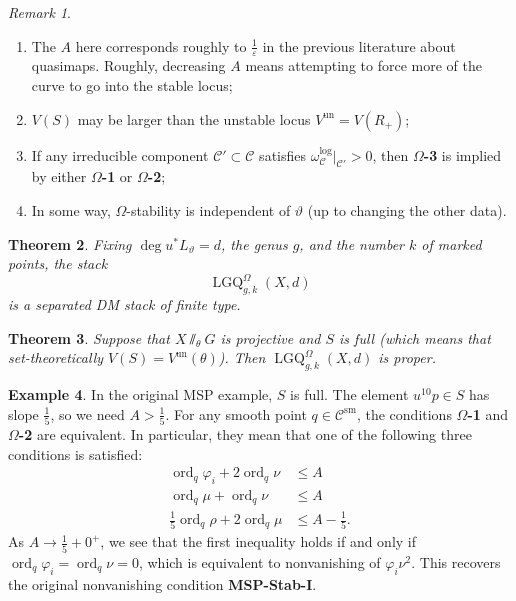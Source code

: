 \documentclass[10pt]{amsart}
\newtheorem{thm}{Theorem}[section]
\theoremstyle{definition}
\newtheorem{exm}[thm]{Example}
\theoremstyle{remark}
\newtheorem{rmk}[thm]{Remark}
\theoremstyle{plain}
\theoremstyle{definition}
\theoremstyle{remark}
\newcommand{\ep}{\varepsilon}
\newcommand{\mc}[1]{\mathcal{#1}}
\newcommand{\mr}[1]{\mathrm{#1}}
\newcommand{\on}[1]{\operatorname{#1}}
\newcommand{\1}{\mathbf{1}}
\newcommand{\2}{\mathbf{2}}
\newcommand{\3}{\mathbf{3}}
\begin{document}
\begin{rmk}\leavevmode
    \begin{enumerate}
        \item The $A$ here corresponds roughly to $\frac{1}{\ep}$ in the previous literature about quasimaps. Roughly, decreasing $A$ means attempting to force more of the curve to go into the stable locus;
        \item $V(S)$ may be larger than the unstable locus $V^{\on{un}} = V(R_+)$;
        \item If any irreducible component $\mc{C}' \subset \mc{C}$ satisfies $\omega_{\mc{C}}^{\log}|_{\mc{C}'} > 0$, then \textbf{$\Omega$-3} is implied by either \textbf{$\Omega$-1} or \textbf{$\Omega$-2};
        \item In some way, $\Omega$-stability is independent of $\vartheta$ (up to changing the other data).
    \end{enumerate}
\end{rmk}

\begin{thm}
    Fixing $\deg u^*L_{\vartheta} = d$, the genus $g$, and the number $k$ of marked points, the stack
    \[ \on{LGQ}^{\Omega}_{g,k}(X,d) \]
    is a separated DM stack of finite type.
\end{thm}

\begin{thm}
    Suppose that $X \sslash_{\theta} G$ is projective and $S$ is \textit{full} (which means that set-theoretically $V(S) = V^{\on{un}}(\theta)$). Then $\on{LGQ}^{\Omega}_{g,k}(X,d)$ is proper.
\end{thm}

\begin{exm}
    In the original MSP example, $S$ is full. The element $u^{10}p \in S$ has slope $\frac{1}{5}$, so we need $A > \frac{1}{5}$. For any smooth point $q \in \mc{C}^{\mr{sm}}$, the conditions \textbf{$\Omega$-1} and \textbf{$\Omega$-2} are equivalent. In particular, they mean that one of the following three conditions is satisfied:
    \begin{align*}
        \on{ord}_q \varphi_i + 2 \on{ord}_q \nu &\leq A \\
        \on{ord}_q \mu + \on{ord}_q \nu &\leq A \\
        \frac{1}{5} \on{ord}_q \rho + 2 \on{ord}_q \mu &\leq A - \frac{1}{5}.
    \end{align*}
    As $A \to \frac{1}{5} + 0^+$, we see that the first inequality holds if and only if $\on{ord}_q \varphi_i = \on{ord}_q \nu = 0$, which is equivalent to nonvanishing of $\varphi_i \nu^2$. This recovers the original nonvanishing condition \textbf{MSP-Stab-I}.
\end{exm}
\end{document}
